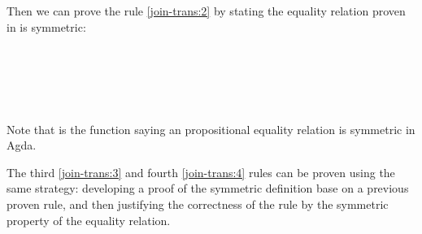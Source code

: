 \documentclass{l4proj}
\begin{document}
Then we can prove the rule \ref{join-trans:2} by stating the equality relation proven in  is symmetric:
\begin{code}%
\>[0]\<%
\\
\>[0]\AgdaSpace{}%
\AgdaSymbol{:}%
\>[667I]\AgdaSymbol{\{}\AgdaSpace{}%
\AgdaSpace{}%
\AgdaSpace{}%
\AgdaSymbol{:}\AgdaSpace{}%
\AgdaSymbol{\}}\AgdaSpace{}%
\AgdaSpace{}%
\AgdaSymbol{\{}\AgdaSpace{}%
\AgdaSymbol{:}\AgdaSpace{}%
\AgdaSymbol{\}}\AgdaSpace{}%
\<%
\\
\>[.][@{}l@{}]\<[667I]%
\>[25]\AgdaSymbol{(}\AgdaSpace{}%
\AgdaSymbol{:}\AgdaSpace{}%
\AgdaSpace{}%
\AgdaSymbol{(}\AgdaSpace{}%
\AgdaSymbol{(}\AgdaSpace{}%
\AgdaSpace{}%
\AgdaSymbol{)}\AgdaSpace{}%
\AgdaSymbol{)}\AgdaSpace{}%
\AgdaSymbol{)}\AgdaSpace{}%
\<%
\\
\>[0][@{}l@{\AgdaIndent{0}}]%
\>[2]\AgdaSpace{}%
\AgdaSpace{}%
\AgdaSymbol{(}\AgdaSpace{}%
\AgdaSymbol{)}\AgdaSpace{}%
\AgdaSpace{}%
\AgdaSpace{}%
\AgdaSymbol{(}\AgdaSpace{}%
\AgdaSymbol{(}\AgdaSpace{}%
\AgdaSpace{}%
\AgdaSymbol{))}\<%
\\
\>[0]\AgdaSpace{}%
\AgdaSpace{}%
\AgdaSymbol{=}\AgdaSpace{}%
\AgdaSpace{}%
\AgdaSymbol{(}\AgdaSpace{}%
\AgdaSymbol{)}\<%
\end{code}
Note that  is the function saying an propositional equality relation is symmetric in Agda.

The third \ref{join-trans:3} and fourth \ref{join-trans:4} rules can be proven using the same strategy: developing a proof of the symmetric definition base on a previous proven rule, and then justifying the correctness of the rule by the symmetric property of the equality relation.
\end{document}
